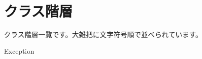 \section{クラス階層}
クラス階層一覧です。大雑把に文字符号順で並べられています。\begin{DoxyCompactList}
\item Exception\begin{DoxyCompactList}
\item {}
\end{DoxyCompactList}
\item {}
\end{DoxyCompactList}
